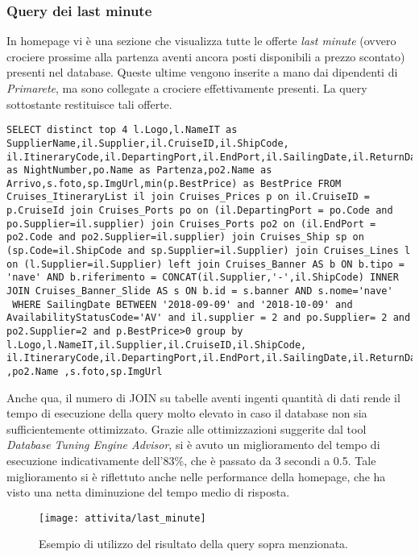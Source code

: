 \subsubsection{Query dei last minute}
In homepage vi è una sezione che visualizza tutte le offerte \textit{last minute} (ovvero crociere prossime alla partenza aventi ancora posti disponibili a prezzo scontato) presenti nel database. Queste ultime vengono inserite a mano dai dipendenti di \textit{Primarete}, ma sono collegate a crociere effettivamente presenti. La query sottostante restituisce tali offerte.
\begin{lstlisting}
SELECT distinct top 4 l.Logo,l.NameIT as SupplierName,il.Supplier,il.CruiseID,il.ShipCode, il.ItineraryCode,il.DepartingPort,il.EndPort,il.SailingDate,il.ReturnDate,il.SailingLengthDays as NightNumber,po.Name as Partenza,po2.Name as Arrivo,s.foto,sp.ImgUrl,min(p.BestPrice) as BestPrice FROM Cruises_ItineraryList il join Cruises_Prices p on il.CruiseID = p.CruiseId join Cruises_Ports po on (il.DepartingPort = po.Code and po.Supplier=il.supplier) join Cruises_Ports po2 on (il.EndPort = po2.Code and po2.Supplier=il.supplier) join Cruises_Ship sp on (sp.Code=il.ShipCode and sp.Supplier=il.Supplier) join Cruises_Lines l on (l.Supplier=il.Supplier) left join Cruises_Banner AS b ON b.tipo = 'nave' AND b.riferimento = CONCAT(il.Supplier,'-',il.ShipCode) INNER JOIN Cruises_Banner_Slide AS s ON b.id = s.banner AND s.nome='nave'
 WHERE SailingDate BETWEEN '2018-09-09' and '2018-10-09' and AvailabilityStatusCode='AV' and il.supplier = 2 and po.Supplier= 2 and po2.Supplier=2 and p.BestPrice>0 group by l.Logo,l.NameIT,il.Supplier,il.CruiseID,il.ShipCode, il.ItineraryCode,il.DepartingPort,il.EndPort,il.SailingDate,il.ReturnDate,il.SailingLengthDays,po.Name ,po2.Name ,s.foto,sp.ImgUrl
\end{lstlisting}
Anche qua, il numero di JOIN su tabelle aventi ingenti quantità di dati rende il tempo di esecuzione della query molto elevato in caso il database non sia sufficientemente ottimizzato. Grazie alle ottimizzazioni suggerite dal tool \textit{Database Tuning Engine Advisor}, si è avuto un miglioramento del tempo di esecuzione indicativamente dell'83\%, che è passato da 3 secondi a 0.5. Tale miglioramento si è riflettuto anche nelle performance della homepage, che ha visto una netta diminuzione del tempo medio di risposta.
\begin{figure}[!h] 
	\centering 
	\texttt{[image: attivita/last\_minute]} 
	\caption{Esempio di utilizzo del risultato della query sopra menzionata.}
\end{figure}